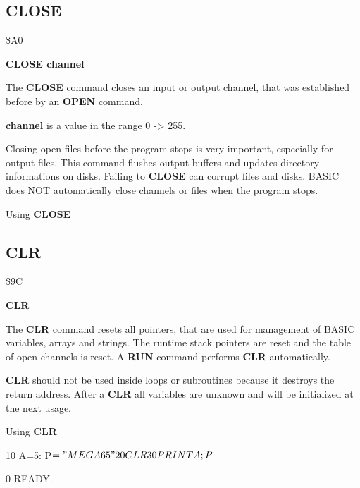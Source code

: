 \subsection{CLOSE}
\begin{description}[leftmargin=3cm,style=nextline]
\item [Token:] \$A0
\item [Format:] {\bf CLOSE channel}
\item [Usage:] The {\bf CLOSE} command closes an input or output
               channel, that was established before by an {\bf OPEN}
               command.

               {\bf channel} is a value in the range 0 -> 255.

\item [Remarks:] Closing open files before the program stops is
               very important, especially for output files.
               This command flushes output buffers and
               updates directory informations on disks.
               Failing to {\bf CLOSE}  can corrupt files and disks.
               BASIC does NOT automatically close channels or files
               when the program stops.

\item [Example:] Using {\bf CLOSE}
\end{description}


\newpage
\subsection{CLR}
\begin{description}[leftmargin=3cm,style=nextline]
\item [Token:] \$9C
\item [Format:] {\bf CLR}
\item [Usage:] The {\bf CLR} command resets all pointers, that
               are used for management of BASIC variables, arrays
               and strings. The runtime stack pointers are reset
               and the table of open channels is reset.
               A {\bf RUN} command performs {\bf CLR} automatically.

\item [Remarks:] {\bf CLR} should not be used inside loops or
               subroutines because it destroys the return address.
               After a {\bf CLR} all variables are unknown and will
               be initialized at the next usage.

\item [Example:] Using {\bf CLR}
\begin{screenoutput}
10 A=5: P$="MEGA 65"
20 CLR
30 PRINT A;P$

0
READY.
\end{screenoutput}
\end{description}

